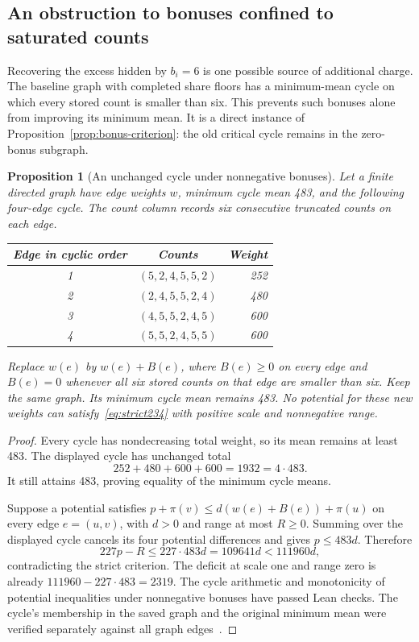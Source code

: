 \documentclass[11pt,a4paper]{article}
\newtheorem{proposition}[theorem]{Proposition}
\theoremstyle{definition}
\theoremstyle{remark}
\begin{document}
\subsection{An obstruction to bonuses confined to saturated counts}\label{sec:unsaturated-obstruction}
Recovering the excess hidden by $b_i=6$ is one possible source of additional
charge. The baseline graph with completed share floors has a minimum-mean cycle on which every
stored count is smaller than six. This prevents such bonuses alone from
improving its minimum mean. It is a direct instance of
Proposition~\ref{prop:bonus-criterion}: the old critical cycle remains in
the zero-bonus subgraph.

\begin{proposition}[An unchanged cycle under nonnegative bonuses]\label{prop:unsaturated-cycle}
Let a finite directed graph have edge weights $w$, minimum cycle mean 483,
and the following four-edge cycle. The count column records six consecutive
truncated counts on each edge.
\begin{center}
\begin{tabular}{c c r}
\toprule
Edge in cyclic order & Counts & Weight\\\midrule
1 & $(5,2,4,5,5,2)$ & 252\\
2 & $(2,4,5,5,2,4)$ & 480\\
3 & $(4,5,5,2,4,5)$ & 600\\
4 & $(5,5,2,4,5,5)$ & 600\\
\bottomrule
\end{tabular}
\end{center}
Replace $w(e)$ by $w(e)+B(e)$, where $B(e)\ge0$ on every edge and $B(e)=0$
whenever all six stored counts on that edge are smaller than six. Keep the
same graph. Its minimum cycle mean remains 483. No potential for these new
weights can satisfy~\eqref{eq:strict234} with positive scale and nonnegative
range.
\end{proposition}
\begin{proof}
Every cycle has nondecreasing total weight, so its mean remains at least 483.
The displayed cycle has unchanged total
\[
252+480+600+600=1932=4\cdot483.
\]
It still attains 483, proving equality of the minimum cycle means.

Suppose a potential satisfies $p+\pi(v)\le d(w(e)+B(e))+\pi(u)$ on every
edge $e=(u,v)$, with $d>0$ and range at most $R\ge0$. Summing over the displayed
cycle cancels its four potential differences and gives $p\le483d$. Therefore
\[
227p-R\le227\cdot483d=109641d<111960d,
\]
contradicting the strict criterion. The deficit at scale one and range zero
is already $111960-227\cdot483=2319$. The cycle arithmetic and monotonicity
of potential inequalities under nonnegative bonuses have passed Lean checks.
The cycle's membership in the saved graph and the original minimum mean were
verified separately against all graph edges~\cite{unsaturatedarchive}.
\end{proof}
\end{document}
